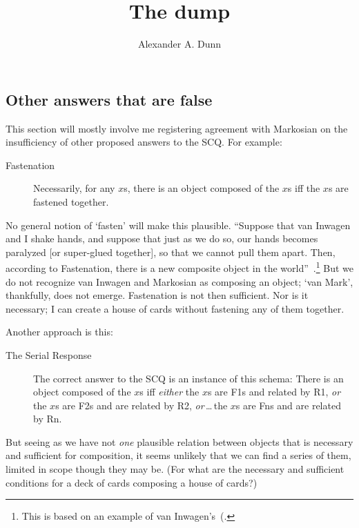\documentclass[11pt]{article}
\title{The dump}
\author{Alexander A. Dunn}
\begin{document}
\maketitle
\begin{spacing}{1}


\section{Other answers that are false}
This section will mostly involve me registering agreement with
Markosian on the insufficiency of other proposed answers to the
SCQ. For example:
\begin{description}
	\item[Fastenation] Necessarily, for any $x$s, there is an
          object composed of the $x$s iff the $x$s are fastened
          together.~\citep[223]{markosian1998a}
\end{description}
No general notion of `fasten' will make this plausible. ``Suppose that
van Inwagen and I shake hands, and suppose that just as we do so, our
hands becomes paralyzed [or super-glued together], so that we cannot
pull them apart. Then, according to Fastenation, there is a new
composite object in the
world''~\citep[224]{markosian1998a}.\footnote{This is based on an
  example of van Inwagen's~(\citeyear[57--58]{inwagen1995}.} But we do
not recognize van Inwagen and Markosian as composing an object; `van
Mark', thankfully, does not emerge. Fastenation is not then
sufficient. Nor is it necessary; I can create a house of cards without
fastening any of them together.

Another approach is this:
\begin{description}
	\item[The Serial Response] The correct answer to the SCQ is an
          instance of this schema: There is an object composed of the
          $x$s iff {\em either} the $x$s are F1s and related by R1,
          {\em or} the $x$s are F2s and are related by R2, {\em
            or}\,\ldots\,the $x$s are Fns and are related by
          Rn.~\citep[230]{markosian1998a}
\end{description}
But seeing as we have not {\em one} plausible relation between objects
that is necessary and sufficient for composition, it seems unlikely
that we can find a series of them, limited in scope though they may
be. (For what are the necessary and sufficient conditions for a deck
of cards composing a house of cards?)



\end{spacing}
\end{document}
